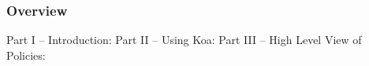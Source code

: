 \documentclass[t,hyperref={pdfpagelabels=false},9pt]{beamer}
\begin{document}
\begin{frame}
\titlepage %
\end{frame}


\begin{frame}
\frametitle{Overview} %
Part I -- Introduction:
\tableofcontents[part=1,hideallsubsections]
Part II -- Using Koa:
\tableofcontents[part=2,hideallsubsections]
Part III -- High Level View of Policies:
\tableofcontents[part=3,hideallsubsections]

\tableofcontents[] %
\end{frame}






%
%
%
%

%
%
\end{document}
